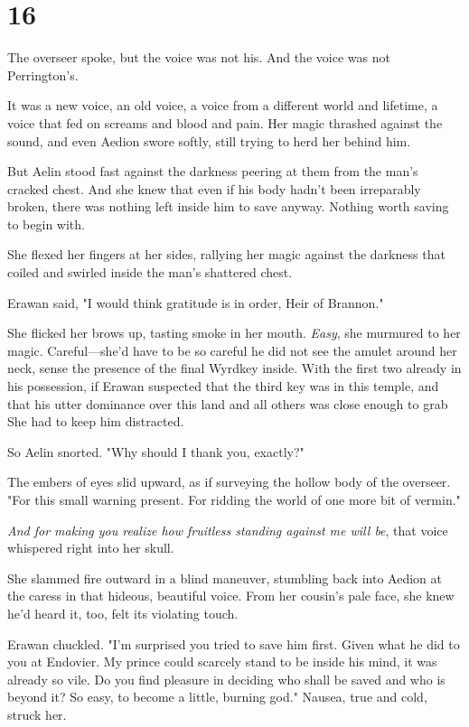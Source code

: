 
\chapter{16}

The overseer spoke, but the voice was not his.
And the voice was not Perrington's.

It was a new voice, an old voice, a voice from a different world and lifetime, a voice that fed on screams and blood and pain.
Her magic thrashed against the sound, and even Aedion swore softly, still trying to herd her behind him.

But Aelin stood fast against the darkness peering at them from the man's cracked chest.
And she knew that even if his body hadn't been irreparably broken, there was nothing left inside him to save anyway.
Nothing worth saving to begin with.

She flexed her fingers at her sides, rallying her magic against the darkness that coiled and swirled inside the man's shattered chest.

Erawan said, "I would think gratitude is in order, Heir of Brannon."

She flicked her brows up, tasting smoke in her mouth.
\emph{Easy}, she murmured to her magic.
Careful---she'd have to be so careful he did not see the amulet around her neck, sense the presence of the final Wyrdkey inside.
With the first two already in his possession, if Erawan suspected that the third key was in this temple, and that his utter dominance over this land and all others was close enough to grab  She had to keep him distracted.

So Aelin snorted.
"Why should I thank you, exactly?"

The embers of eyes slid upward, as if surveying the hollow body of the overseer.
"For this small warning present.
For ridding the world of one more bit of vermin."

\emph{And for making you realize how fruitless standing against me will be}, that voice whispered right into her skull.

She slammed fire outward in a blind maneuver, stumbling back into Aedion at the caress in that hideous, beautiful voice.
From her cousin's pale face, she knew he'd heard it, too, felt its violating touch.

Erawan chuckled.
"I'm surprised you tried to save him first.
Given what he did to you at Endovier.
My prince could scarcely stand to be inside his mind, it was already so vile.
Do you find pleasure in deciding who shall be saved and who is beyond it?
So easy, to become a little, burning god."
Nausea, true and cold, struck her.


